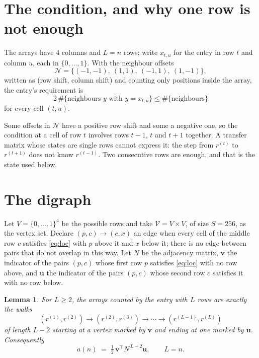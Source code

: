\documentclass[11pt,a4paper]{article}
\theoremstyle{plain}
\newtheorem{lemma}[theorem]{Lemma}
\theoremstyle{definition}
\begin{document}
\section{The condition, and why one row is not enough}

The arrays have $4$ columns and $L=n$ rows; write $x_{t,u}$ for the entry in
row $t$ and column $u$, each in $\{0,\dots,1\}$. With the neighbour offsets
\[
\mathcal N=\{(-1,-1),\ (1,1),\ (-1,1),\ (1,-1)\},
\]
written as (row shift, column shift) and counting only positions inside the array, the
entry's requirement is
\begin{equation}\label{eq:loc}
2\,\#\{\text{neighbours }y\text{ with }y=x_{t,u}\}\le\#\{\text{neighbours}\}
\end{equation}
for every cell $(t,u)$.

Some offsets in $\mathcal N$ have a positive row shift and some a negative one, so the
condition at a cell of row $t$ involves rows $t-1$, $t$ and $t+1$ together. A transfer
matrix whose states are single rows cannot express it: the step from $r^{(t)}$ to
$r^{(t+1)}$ does not know $r^{(t-1)}$. Two consecutive rows are enough, and that is
the state used below.

\section{The digraph}

Let $V=\{0,\dots,1\}^{4}$ be the possible rows and take
$\mathcal V=V\times V$, of size $S=256$, as the vertex set. Declare $(p,c)\to(c,x)$ an edge
when every cell of the middle row $c$ satisfies \eqref{eq:loc} with $p$ above it and $x$
below it; there is no edge between pairs that do not overlap in this way. Let $N$ be the
adjacency matrix, $\mathbf{v}$ the indicator of the pairs $(p,c)$ whose first row $p$
satisfies \eqref{eq:loc} with no row above, and $\mathbf{u}$ the indicator of
the pairs $(p,c)$ whose second row $c$ satisfies it with no row below.

\begin{lemma}\label{lem:walk}
For $L\ge2$, the arrays counted by the entry with $L$ rows are exactly the walks
\[
(r^{(1)},r^{(2)})\to(r^{(2)},r^{(3)})\to\cdots\to(r^{(L-1)},r^{(L)})
\]
of length $L-2$ starting at a vertex marked by $\mathbf{v}$ and ending at one marked by
$\mathbf{u}$. Consequently
\[
a(n)\;=\;\tfrac1{2}\,\mathbf{v}^{\!\top}N^{\,L-2}\mathbf{u},\qquad L=n .
\]
\end{lemma}
\end{document}
